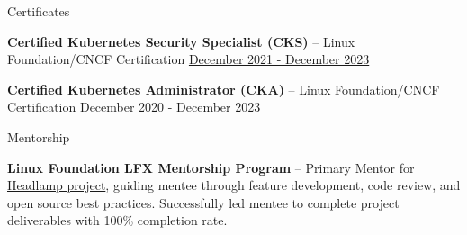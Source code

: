 \documentclass{resume} %
\begin{document}

\begin{rSection}{Certificates}
\vspace{0.05cm}
  \begin{rProjectSection}
    \item \textbf{Certified Kubernetes Security Specialist (CKS)} -- Linux Foundation/CNCF Certification \href{https://www.credly.com/badges/05e37407-4ea5-4a88-b8c8-4e26235d7da1}{December 2021 - December 2023}
  \end{rProjectSection}
  \begin{rProjectSection}
    \item \textbf{Certified Kubernetes Administrator (CKA)} -- Linux Foundation/CNCF Certification \href{https://www.credly.com/badges/e93b0ba2-51ea-41b3-82ba-10cf4d67ac70}{December 2020 - December 2023}
  \end{rProjectSection}
\end{rSection}


\begin{rSection}{Mentorship}
\vspace{0.05cm}
  \begin{rProjectSection}
    \item \textbf{Linux Foundation LFX Mentorship Program} -- Primary Mentor for \href{https://mentorship.lfx.linuxfoundation.org/project/992fc67e-ff9e-41fd-8062-28ec8733903f}{Headlamp project}, guiding mentee through feature development, code review, and open source best practices. Successfully led mentee to complete project deliverables with 100\% completion rate.
  \end{rProjectSection}
\end{rSection}

\end{document}
